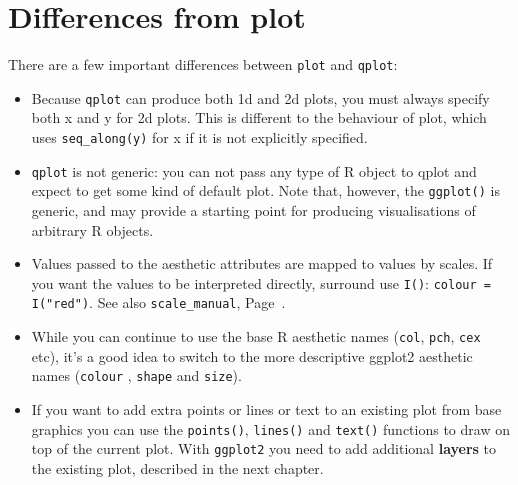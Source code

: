 % 


\section{Differences from plot}
\label{sec:plot_diffs}

There are a few important differences between {\tt plot} and {\tt qplot}:

\begin{itemize}
  \item Because {\tt qplot} can produce both 1d and 2d plots, you must always specify both x and y for 2d plots.  This is different to the behaviour of plot, which uses {\tt seq\_along(y)} for x if it is not explicitly specified.
  
  \item {\tt qplot} is not generic: you can not pass any type of R object to qplot and expect to get some kind of default plot.  Note that, however, the {\tt ggplot()} is generic, and may provide a starting point for producing visualisations of arbitrary R objects.
  
  \item Values passed to the aesthetic attributes are mapped to values by scales.  If you want the values to be interpreted directly, surround use {\tt I()}: {\tt colour = I("red")}.  See also {\tt scale\_manual}, Page~\pageref{sec:scale_special}.
  
  \item While you can continue to use the base R aesthetic names ({\tt col},  {\tt pch}, {\tt cex} etc), it's a good idea to switch to the more descriptive ggplot2 aesthetic names ({\tt colour} , {\tt shape} and {\tt size}).

  \item If you want to add extra points or lines or text to an existing plot from base graphics you can use the {\tt points()}, {\tt lines()} and {\tt text()} functions to draw on top of the current plot.  With {\tt ggplot2} you need to add additional {\bf layers} to the existing plot, described in the next chapter.
  
\end{itemize}


